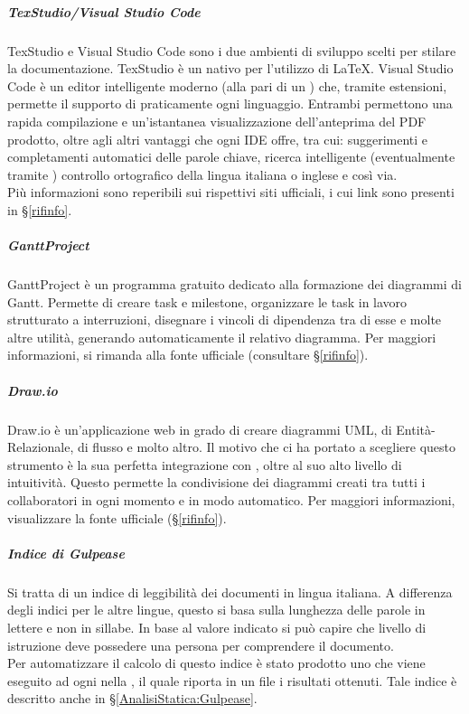 			\subparagraph{TexStudio/Visual Studio Code}
			TexStudio e Visual Studio Code sono i due ambienti di sviluppo scelti per stilare la documentazione.
			TexStudio è un  nativo per l'utilizzo di \LaTeX. Visual Studio Code è un editor intelligente moderno (alla pari di un ) che, tramite
			estensioni, permette il supporto di praticamente ogni linguaggio.
			Entrambi permettono una rapida compilazione e un'istantanea visualizzazione dell'anteprima del PDF prodotto, oltre agli altri vantaggi che ogni IDE offre,
			tra cui: suggerimenti e completamenti automatici delle parole chiave, ricerca intelligente (eventualmente tramite ) controllo ortografico della
			lingua italiana o inglese e così via.\\
			Più informazioni sono reperibili sui rispettivi siti ufficiali, i cui link sono presenti in \S\ref{rifinfo}.

			\subparagraph{GanttProject}
			GanttProject è un programma gratuito dedicato alla formazione dei diagrammi di Gantt. Permette di creare task e milestone, organizzare le task in lavoro
			strutturato a interruzioni, disegnare i vincoli di dipendenza tra di esse e molte altre utilità, generando automaticamente il relativo diagramma.
			Per maggiori informazioni, si rimanda alla fonte ufficiale (consultare \S\ref{rifinfo}).

			\subparagraph{Draw.io}\label{drawio}
			Draw.io è un'applicazione web in grado di creare diagrammi UML, di Entità-Relazionale, di flusso e molto altro. Il motivo che ci ha portato
			a scegliere questo strumento è la sua perfetta integrazione con , oltre al suo alto livello di intuitività.
			Questo permette la condivisione dei diagrammi creati tra tutti i collaboratori in ogni momento e in modo automatico.
			Per maggiori informazioni, visualizzare la fonte ufficiale (\S\ref{rifinfo}).

			\subparagraph{Indice di Gulpease}
			Si tratta di un indice di leggibilità dei documenti in lingua italiana. A differenza degli indici per le altre lingue, questo si basa sulla lunghezza delle parole in lettere e non in sillabe. In base al valore indicato si può capire che livello di istruzione deve possedere una persona per comprendere il documento.\\
            Per automatizzare il calcolo di questo indice è stato prodotto uno  che viene eseguito ad ogni  nella , il quale riporta in un file i risultati ottenuti. Tale indice è descritto anche in \S\ref{AnalisiStatica:Gulpease}.

